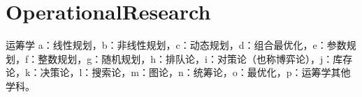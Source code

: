 

\chapter{OperationalResearch}

运筹学
a：线性规划，b：非线性规划，c：动态规划，d：组合最优化，e：参数规划，f：整数规划，g：随机规划，h：排队论，i：对策论（也称博弈论），j：库存论，k：决策论，l：搜索论，m：图论，n：统筹论，o：最优化，p：运筹学其他学科。
